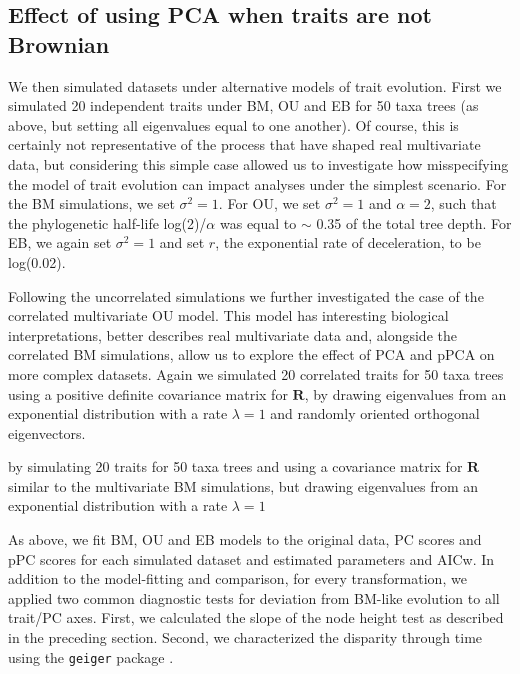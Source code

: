 \documentclass[a4paper,11pt]{article}
\begin{document}
\subsection{Effect of using PCA when traits are not Brownian}
We then simulated datasets under alternative  models of trait evolution. First we simulated 20 independent traits under BM, OU and EB for 50 taxa trees (as above, but setting all eigenvalues equal to one another). Of course, this is certainly not representative of the process that have shaped real multivariate data, but considering this simple case allowed us to investigate how misspecifying the model of trait evolution can impact analyses under the simplest scenario. For the BM simulations, we set $\sigma^2=\text{1}$. For OU, we set $\sigma^2=\text{1}$ and $\alpha=\text{2}$, such that the phylogenetic half-life log(2)/$\alpha$ \citep{Hansen2008} was equal to $\sim$ 0.35 of the total tree depth. For EB, we again set $\sigma^2=\text{1}$ and set $r$, the exponential rate of deceleration, to be log(0.02).

Following the uncorrelated simulations we further investigated the case of the correlated multivariate OU model. This model has interesting biological interpretations, better describes real multivariate data and, alongside the correlated BM simulations, allow us to explore the effect of PCA and pPCA on more complex datasets. Again we simulated 20 correlated traits for 50 taxa trees using a positive definite covariance matrix for $\mathbf{R}$, by drawing eigenvalues from an exponential distribution with a rate $\lambda = \text{1}$ and randomly oriented orthogonal eigenvectors.

 by simulating 20 traits for 50 taxa trees and using a 
covariance matrix for $\mathbf{R}$ similar to the multivariate BM simulations, but drawing eigenvalues from an exponential distribution with a rate $\lambda = \text{1}$

As above, we fit BM, OU and EB models to the original data, PC scores and pPC scores for each simulated dataset and estimated parameters and AICw. In addition to the model-fitting and comparison, for every transformation, we applied two common diagnostic tests for deviation from BM-like evolution to all trait/PC axes. First, we calculated the slope of the node height test as described in the preceding section. Second, we characterized the disparity through time \citep{Harmon2003} using the \texttt{geiger} package \citep{geiger2}. 
\end{document}

